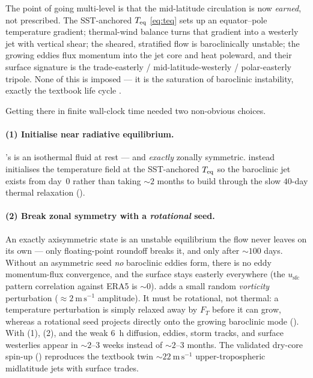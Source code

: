 The point of going multi-level is that the mid-latitude circulation is now
\emph{earned}, not prescribed. The SST-anchored $T_{\mathrm{eq}}$ \eqref{eq:teq} sets up an
equator--pole temperature gradient; thermal-wind balance turns that gradient into
a westerly jet with vertical shear; the sheared, stratified flow is
baroclinically unstable; the growing eddies flux momentum into the jet core and
heat poleward, and their surface signature is the trade-easterly /
mid-latitude-westerly / polar-easterly tripole. None of this is imposed --- it is
the saturation of baroclinic instability, exactly the textbook life cycle
\citep[Ch.~9, 12]{vallis2017}.

Getting there in finite wall-clock time needed two non-obvious choices.

\paragraph{(1) Initialise near radiative equilibrium.} \dino{}'s
 is an isothermal fluid at rest --- and
\emph{exactly} zonally symmetric. \model{} instead initialises the temperature
field at the SST-anchored $T_{\mathrm{eq}}$ so the baroclinic jet exists from day~0 rather
than taking $\sim 2$ months to build through the slow $40$-day thermal relaxation
().

\paragraph{(2) Break zonal symmetry with a \emph{rotational} seed.} An exactly
axisymmetric state is an unstable equilibrium the flow never leaves on its own ---
only floating-point roundoff breaks it, and only after $\sim 100$ days. Without an
asymmetric seed \emph{no} baroclinic eddies form, there is no eddy
momentum-flux convergence, and the surface stays easterly everywhere (the $u_{\mathrm{sfc}}$
pattern correlation against ERA5 is $\sim 0$). \model{} adds a small random
\emph{vorticity} perturbation ($\approx 2\ \mathrm{m\,s^{-1}}$ amplitude). It must
be rotational, not thermal: a temperature perturbation is simply relaxed away by
$F_T$ before it can grow, whereas a rotational seed projects directly onto the
growing baroclinic mode (). With (1), (2), and the weak $6$~h
diffusion, eddies, storm tracks, and surface westerlies appear in $\sim 2$--$3$
weeks instead of $\sim 2$--$3$ months. The validated dry-core spin-up
()
reproduces the textbook twin $\sim 22\ \mathrm{m\,s^{-1}}$ upper-tropospheric
midlatitude jets with surface trades.

